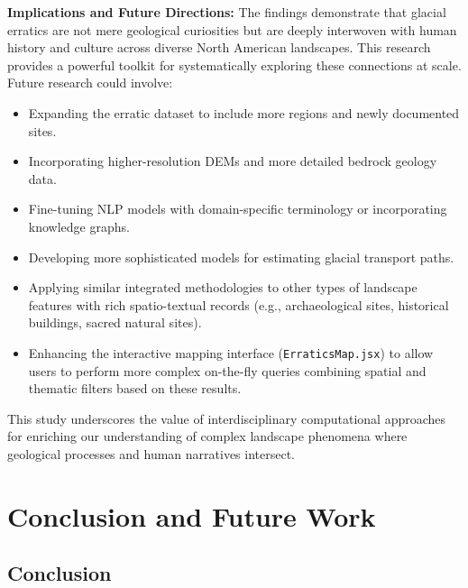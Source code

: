\documentclass[
11pt, %
english, %
singlespacing, %
headsepline, %
]{MastersDoctoralThesis} %
\begin{document}
\textbf{Implications and Future Directions:}
The findings demonstrate that glacial erratics are not mere geological curiosities but are deeply interwoven with human history and culture across diverse North American landscapes. This research provides a powerful toolkit for systematically exploring these connections at scale. Future research could involve:
\begin{itemize}
    \item Expanding the erratic dataset to include more regions and newly documented sites.
    \item Incorporating higher-resolution DEMs and more detailed bedrock geology data.
    \item Fine-tuning NLP models with domain-specific terminology or incorporating knowledge graphs.
    \item Developing more sophisticated models for estimating glacial transport paths.
    \item Applying similar integrated methodologies to other types of landscape features with rich spatio-textual records (e.g., archaeological sites, historical buildings, sacred natural sites).
    \item Enhancing the interactive mapping interface (\texttt{ErraticsMap.jsx}) to allow users to perform more complex on-the-fly queries combining spatial and thematic filters based on these results.
\end{itemize}
This study underscores the value of interdisciplinary computational approaches for enriching our understanding of complex landscape phenomena where geological processes and human narratives intersect.


\chapter{Conclusion and Future Work}
\label{chapter:conclusion}

\section{Conclusion}
\label{sec:conclusion_summary}
\end{document}
